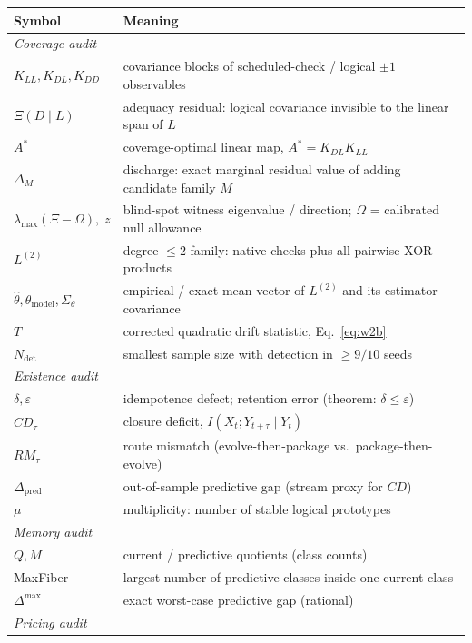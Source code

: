 \documentclass[11pt]{article}
\newcommand{\Xires}{\Xi(D \mid L)}
\theoremstyle{definition}
\begin{document}
\begin{table}[htbp]
\centering\small
\begin{tabular}{l p{10.5cm}}
\toprule
Symbol & Meaning \\
\midrule
\multicolumn{2}{l}{\emph{Coverage audit}} \\
$K_{LL}, K_{DL}, K_{DD}$ & covariance blocks of scheduled-check / logical $\pm1$ observables \\
$\Xires$ & adequacy residual: logical covariance invisible to the linear span of $L$ \\
$A^{*}$ & coverage-optimal linear map, $A^{*} = K_{DL}K_{LL}^{+}$ \\
$\Delta_M$ & discharge: exact marginal residual value of adding candidate family $M$ \\
$\lambda_{\max}(\Xi - \Omega),\; z$ & blind-spot witness eigenvalue / direction; $\Omega$ = calibrated null allowance \\
$L^{(2)}$ & degree-$\le2$ family: native checks plus all pairwise XOR products \\
$\hat\theta, \theta_{\mathrm{model}}, \Sigma_\theta$ & empirical / exact mean vector of $L^{(2)}$ and its estimator covariance \\
$T$ & corrected quadratic drift statistic, Eq.~\eqref{eq:w2b} \\
$N_{\mathrm{det}}$ & smallest sample size with detection in $\ge 9/10$ seeds \\
\midrule
\multicolumn{2}{l}{\emph{Existence audit}} \\
$\delta, \varepsilon$ & idempotence defect; retention error (theorem: $\delta \le \varepsilon$) \\
$CD_\tau$ & closure deficit, $I(X_t; Y_{t+\tau} \mid Y_t)$ \\
$RM_\tau$ & route mismatch (evolve-then-package vs.\ package-then-evolve) \\
$\Delta_{\mathrm{pred}}$ & out-of-sample predictive gap (stream proxy for $CD$) \\
$\mu$ & multiplicity: number of stable logical prototypes \\
\midrule
\multicolumn{2}{l}{\emph{Memory audit}} \\
$Q, M$ & current / predictive quotients (class counts) \\
MaxFiber & largest number of predictive classes inside one current class \\
$\Delta^{\max}$ & exact worst-case predictive gap (rational) \\
\midrule
\multicolumn{2}{l}{\emph{Pricing audit}} \\

\end{tabular}
\end{table}
\end{document}
